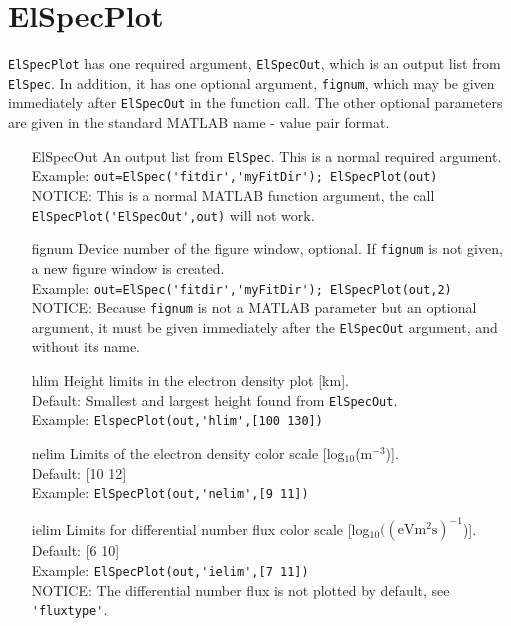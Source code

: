 \documentclass[12pt,a4paper]{report}
\begin{document}
\section{ElSpecPlot}

\verb|ElSpecPlot| has one required argument, \verb|ElSpecOut|, which is an output list from \verb|ElSpec|. In addition, it has one optional argument, \verb|fignum|, which may be given immediately after \verb|ElSpecOut| in the function call. The other optional parameters are given in the standard MATLAB name - value pair format. 

\begin{itemize}
\item[ElSpecOut] An output list from \verb|ElSpec|. This is a normal required argument. \\
Example: \verb|out=ElSpec('fitdir','myFitDir'); ElSpecPlot(out)|\\
NOTICE: This is a normal MATLAB function argument, the call \\\verb|ElSpecPlot('ElSpecOut',out)| will not work.\\

\item[fignum] Device number of the figure window, optional. If \verb|fignum| is not given, a new figure window is created. \\
Example: \verb|out=ElSpec('fitdir','myFitDir'); ElSpecPlot(out,2)|\\
NOTICE: Because \verb|fignum| is not a MATLAB parameter but an optional argument, it must be given immediately after the \verb|ElSpecOut| argument, and without its name. 

\item[hlim] Height limits in the electron density plot [km]. \\
Default: Smallest and largest height found from \verb|ElSpecOut|.\\
Example: \verb|ElspecPlot(out,'hlim',[100 130])|\\

\item[nelim] Limits of the electron density color scale [log$_{10}$(m$^{-3}$)].\\
Default: [10 12]\\
Example: \verb|ElSpecPlot(out,'nelim',[9 11])|\\

\item[ielim] Limits for differential number flux color scale [log$\mathrm{_{10}((eVm^2s)^{-1}}$)].\\
Default: [6 10]\\
Example: \verb|ElSpecPlot(out,'ielim',[7 11])|\\
NOTICE: The differential number flux is not plotted by default, see \verb|'fluxtype'|.\\


\end{itemize}
\end{document}

